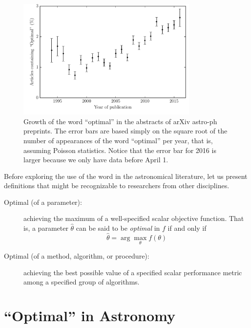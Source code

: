 \documentclass[12pt, preprint]{aastex}
\begin{document}
\begin{figure}[ht!]
  \begin{center}
    \includegraphics[width=0.8\textwidth]{yearly.pdf}
  \end{center}
  \caption{Growth of the word ``optimal'' in the abstracts of arXiv
    astro-ph preprints.  The error bars are based simply on the square
    root of the number of appearances of the word ``optimal'' per
    year, that is, assuming Poisson statistics.  Notice that the error
    bar for 2016 is larger because we only have data before April 1.}
\end{figure}


Before exploring the use of the word in the astronomical literature, let
us present definitions that might be recognizable to researchers from other
disciplines.

\begin{description}
\item[Optimal (of a parameter):] achieving the maximum of a
  well-specified scalar objective function.  That is, a parameter
  $\hat{\theta}$ can be said to be \emph{optimal} in $f$ if and only
  if
  \[
  \hat{\theta} = \arg\max_{\theta} f(\theta)
  \]
\item[Optimal (of a method, algorithm, or procedure):] achieving the
  best possible value of a specified scalar performance metric among a
  specified group of algorithms.
\end{description}

\section{``Optimal'' in Astronomy}
\end{document}
